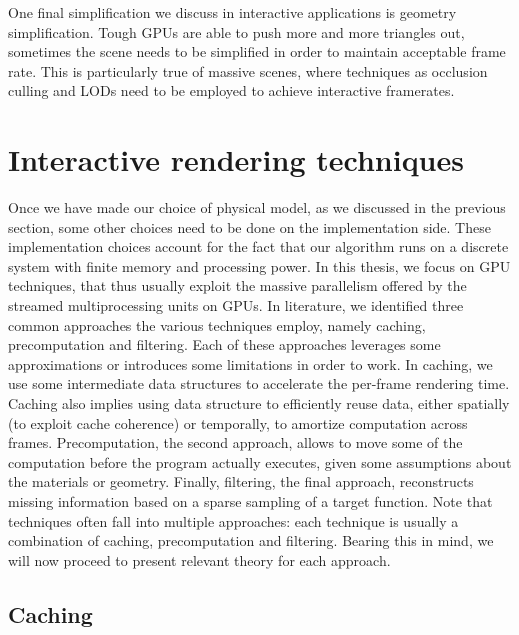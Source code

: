 One final simplification we discuss in interactive applications is geometry simplification. Tough GPUs are able to push more and more triangles out, sometimes the scene needs to be simplified in order to maintain acceptable frame rate. This is particularly true of massive scenes, where techniques as occlusion culling and LODs need to be employed to achieve interactive framerates. 

\section{Interactive rendering techniques}
%
Once we have made our choice of physical model, as we discussed in the previous section,  some other choices need to be done on the implementation side. These implementation choices account for the fact that our algorithm runs on a discrete system with finite memory and processing power. In this thesis, we focus on GPU techniques, that thus usually exploit the massive parallelism offered by the streamed multiprocessing units on GPUs. In literature, we identified three common approaches the various techniques employ, namely caching, precomputation and filtering. Each of these approaches leverages some approximations or introduces some limitations in order to work. In caching, we use some intermediate data structures to accelerate the per-frame rendering time. Caching also implies using data structure to efficiently reuse data, either spatially (to exploit cache coherence) or temporally, to amortize computation across frames. Precomputation, the second approach, allows to move some of the computation before the program actually executes, given some assumptions about the materials or geometry. Finally, filtering, the final approach, reconstructs missing information based on a sparse sampling of a target function. Note that techniques often fall into multiple approaches: each technique is usually a combination of caching, precomputation and filtering. Bearing this in mind, we will now proceed to present relevant theory for each approach.
%
\subsection{Caching}

